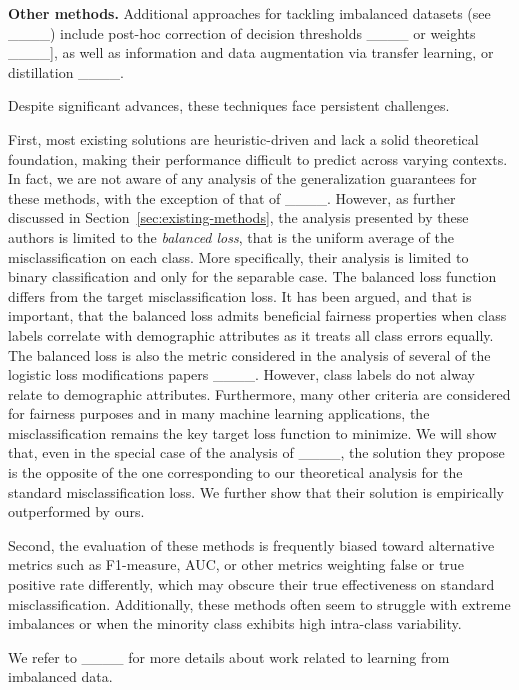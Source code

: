 \textbf{Other methods.} Additional approaches for tackling imbalanced
datasets (see ____) include post-hoc
correction of decision thresholds ____ or
weights ____], as well as information and data
  augmentation via transfer learning, or
  distillation ____.

Despite significant advances, these techniques face persistent
challenges.

First, most existing solutions are heuristic-driven and lack a solid
theoretical foundation, making their performance difficult to predict
across varying contexts.  In fact, we are not aware of any analysis of
the generalization guarantees for these methods, with the exception of
that of ____. However, as further discussed in
Section~\ref{sec:existing-methods}, the analysis presented by these
authors is limited to the \emph{balanced loss}, that is the uniform
average of the misclassification on each class.  More specifically,
their analysis is limited to binary classification and only for the
separable case.
%
The balanced loss function differs from the target misclassification
loss. It has been argued, and that is important, that the balanced
loss admits beneficial fairness properties when class labels correlate
with demographic attributes as it treats all class errors equally.
The balanced loss is also the metric considered in the analysis of
several of the logistic loss modifications papers
____.
However, class labels do not alway relate to demographic attributes.
Furthermore, many other criteria are considered for fairness purposes
and in many machine learning applications, the misclassification
remains the key target loss function to minimize.  We will show that,
even in the special case of the analysis of ____,
the solution they propose is the opposite of the one corresponding to
our theoretical analysis for the standard misclassification loss. We
further show that their solution is empirically outperformed by ours.

Second, the evaluation of these methods is frequently biased toward
alternative metrics such as F1-measure, AUC, or other metrics
weighting false or true positive rate differently, which may obscure
their true effectiveness on standard misclassification.  Additionally,
these methods often seem to struggle with extreme imbalances or when
the minority class exhibits high intra-class variability.

We refer to ____ for more details about
work related to learning from imbalanced data.